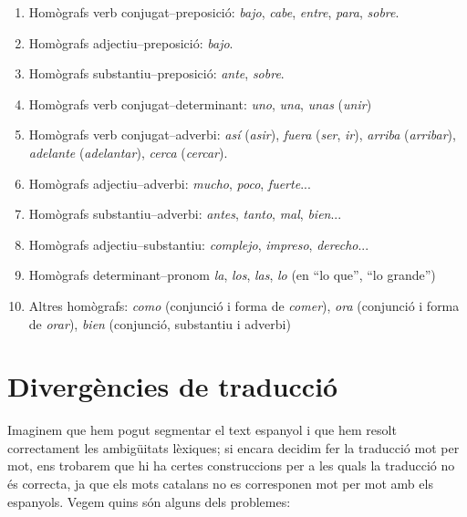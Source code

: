 \begin{enumerate}
\item Homògrafs verb conjugat--preposició: \emph{bajo}, {\em
    cabe}, \emph{entre}, \emph{para}, \emph{sobre}.

\item Homògrafs adjectiu--preposició: \emph{bajo}.

\item Homògrafs substantiu--preposició: \emph{ante}, \emph{sobre}.

\item Homògrafs verb conjugat--determinant:  \emph{uno}, \emph{una},
  \emph{unas} (\emph{unir})
    
\item Homògrafs verb conjugat--adverbi: \emph{así} (\emph{asir}),
    \emph{fuera} (\emph{ser}, \emph{ir}), \emph{ arriba} (\emph{arribar}), {\em
      adelante} (\emph{adelantar}), \emph{cerca} (\emph{cercar}).

\item Homògrafs adjectiu--adverbi: \emph{mucho}, \emph{poco}, {\em
    fuerte}...

\item Homògrafs substantiu--adverbi: \emph{antes}, \emph{tanto},
  \emph{mal}, \emph{bien}...

\item Homògrafs adjectiu--substantiu: \emph{complejo}, {\em
    impreso}, \emph{derecho}...

\item Homògrafs determinant--pronom
    \emph{la}, \emph{los}, \emph{las}, \emph{lo} (en ``lo que'', ``lo grande'')

\item Altres homògrafs: \emph{como} (conjunció i forma de \emph{comer}), \emph{ora} 
  (conjunció i forma de \emph{orar}), \emph{bien} (conjunció, substantiu i
adverbi)

\end{enumerate}


\section{Divergències de traducció}

Imaginem que hem pogut segmentar el text espanyol i que hem resolt 
correctament les ambigüitats
lèxiques; si encara decidim fer la traducció mot per mot, ens
trobarem que hi ha certes construccions per a les quals la
traducció no és correcta, ja que els mots catalans no es
corresponen mot per mot amb els espanyols. Vegem quins són 
alguns dels problemes:

